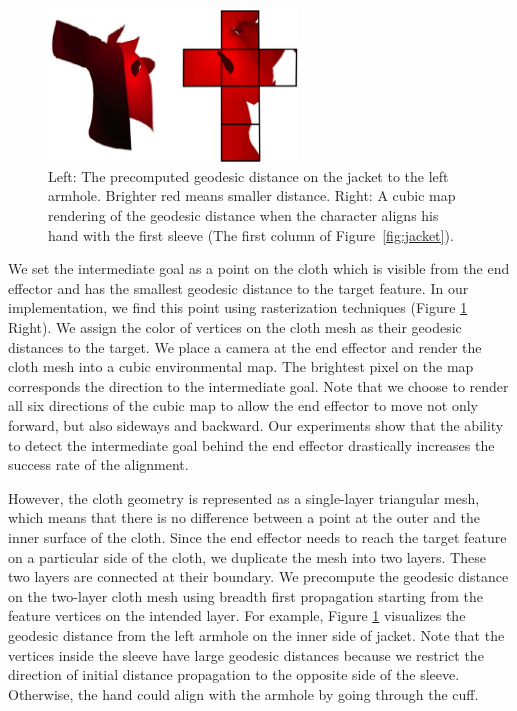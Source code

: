 \begin{figure}[!t]
  \centering
  \includegraphics[width=2.6in]{images/geodesic}
  \caption{Left: The precomputed geodesic distance on the jacket to the left armhole. Brighter red means smaller distance. Right: A cubic map rendering of the geodesic distance when the character aligns his hand with the first sleeve (The first column of Figure~\ref{fig:jacket}).}
  \label{fig:geodesic}
\end{figure}


We set the intermediate goal as a point on the cloth which is visible from the end effector and has the smallest geodesic distance to the target feature. In our implementation, we find this point using rasterization techniques (Figure \ref{fig:geodesic} Right). We assign the color of vertices on the cloth mesh as their geodesic distances to the target. We place a camera at the end effector and render the cloth mesh into a cubic environmental map. The brightest pixel on the map corresponds the direction to the intermediate goal. Note that we choose to render all six directions of the cubic map to allow the end effector to move not only forward, but also sideways and backward. Our experiments show that the ability to detect the intermediate goal behind the end effector drastically increases the success rate of the alignment. 

However, the cloth geometry is represented as a single-layer triangular mesh, which means that there is no difference between a point at the outer and the inner surface of the cloth. Since the end effector needs to reach the target feature on a particular side of the cloth, we duplicate the mesh into two layers. These two layers are connected at their boundary. We precompute the geodesic distance on the two-layer cloth mesh using breadth first propagation starting from the feature vertices on the intended layer. For example, Figure \ref{fig:geodesic} visualizes the geodesic distance from the left armhole on the inner side of jacket. Note that the vertices inside the sleeve have large geodesic distances because we restrict the direction of initial distance propagation to the opposite side of the sleeve. Otherwise, the hand could align with the armhole by going through the cuff. 

